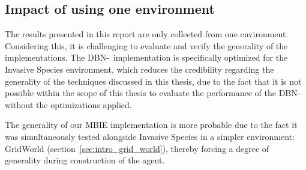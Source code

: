 \subsection{Impact of using one environment}
\label{sec:impact_of_one_env}

The results presented in this report are only collected from one environment.
Considering this, it is challenging to evaluate and verify the generality of the
implementations. The DBN-\etre\ implementation is specifically optimized for the Invasive Species
environment, which reduces the credibility regarding the generality of the
techniques discussed in this thesis, due to the fact that it is not possible
within the scope of this thesis to evaluate the performance of the DBN-\etre\,
without the optimizations applied. 

The generality of our MBIE implementation is more probable due to the fact it was simultaneously
tested alongside Invasive Species in a simpler environment: GridWorld
(section~\ref{sec:intro_grid_world}), thereby forcing a degree of generality during
construction of the agent.
